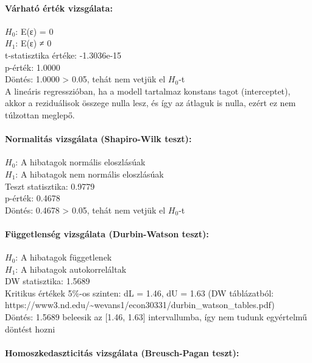\documentclass[11pt]{article}
\begin{document}
\paragraph{Várható érték
vizsgálata:}\label{vuxe1rhatuxf3-uxe9rtuxe9k-vizsguxe1lata}

$H_0$: E(ε) = 0\\
$H_1$: E(ε) ≠ 0\\
t-statisztika értéke: -1.3036e-15\\
p-érték: 1.0000\\
Döntés: 1.0000 \textgreater{} 0.05, tehát nem vetjük el $H_0$-t\\
A lineáris regresszióban, ha a modell tartalmaz konstans tagot
(interceptet), akkor a reziduálisok összege nulla lesz, és így az
átlaguk is nulla, ezért ez nem túlzottan meglepő.

\paragraph{Normalitás vizsgálata (Shapiro-Wilk
teszt):}\label{normalituxe1s-vizsguxe1lata-shapiro-wilk-teszt}

$H_0$: A hibatagok normális eloszlásúak\\
$H_1$: A hibatagok nem normális eloszlásúak\\
Teszt statisztika: 0.9779\\
p-érték: 0.4678\\
Döntés: 0.4678 \textgreater{} 0.05, tehát nem vetjük el $H_0$-t

\paragraph{Függetlenség vizsgálata (Durbin-Watson
teszt):}\label{fuxfcggetlensuxe9g-vizsguxe1lata-durbin-watson-teszt}

$H_0$: A hibatagok függetlenek\\
$H_1$: A hibatagok autokorreláltak\\
DW statisztika: 1.5689\\
Kritikus értékek 5\%-os szinten: dL = 1.46, dU = 1.63 (DW táblázatból:
https://www3.nd.edu/\textasciitilde wevans1/econ30331/durbin\_watson\_tables.pdf)\\
Döntés: 1.5689 beleesik az {[}1.46, 1.63{]} intervallumba, így nem
tudunk egyértelmű döntést hozni

\paragraph{Homoszkedaszticitás vizsgálata (Breusch-Pagan
teszt):}\label{homoszkedaszticituxe1s-vizsguxe1lata-breusch-pagan-teszt}
\end{document}
